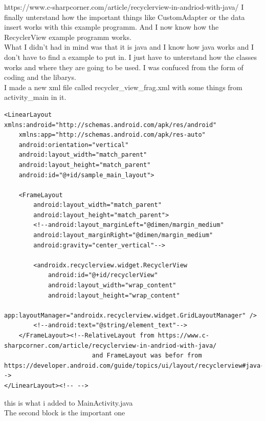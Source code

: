 https://www.c-sharpcorner.com/article/recyclerview-in-andriod-with-java/
I finally unterstand how the important things like CustomAdapter or the data insert works with this example programm. And I now know how the
RecyclerView example programm works. \\
What I didn't had in mind was that it is java and I know how java works and I don't have to find a example to put in. I just have to unterstand
how the classes works and where they are going to be used. I was confuced from the form of coding and the libarys.
\\
I made a new xml file called recycler\_view\_frag.xml with some things from activity\_main in it. 

\newpage

\begin{lstlisting}
<LinearLayout xmlns:android="http://schemas.android.com/apk/res/android"
    xmlns:app="http://schemas.android.com/apk/res-auto"
    android:orientation="vertical"
    android:layout_width="match_parent"
    android:layout_height="match_parent"
    android:id="@+id/sample_main_layout">

    <FrameLayout
        android:layout_width="match_parent"
        android:layout_height="match_parent">
        <!--android:layout_marginLeft="@dimen/margin_medium"
        android:layout_marginRight="@dimen/margin_medium"
        android:gravity="center_vertical"-->

        <androidx.recyclerview.widget.RecyclerView
            android:id="@+id/recyclerView"
            android:layout_width="wrap_content"
            android:layout_height="wrap_content"
            app:layoutManager="androidx.recyclerview.widget.GridLayoutManager" />
        <!--android:text="@string/element_text"-->
    </FrameLayout><!--RelativeLayout from https://www.c-sharpcorner.com/article/recyclerview-in-andriod-with-java/
                        and FrameLayout was befor from https://developer.android.com/guide/topics/ui/layout/recyclerview#java-->
</LinearLayout><!-- -->
\end{lstlisting}

this is what i added to MainActivity.java
\\
The second block is the important one

